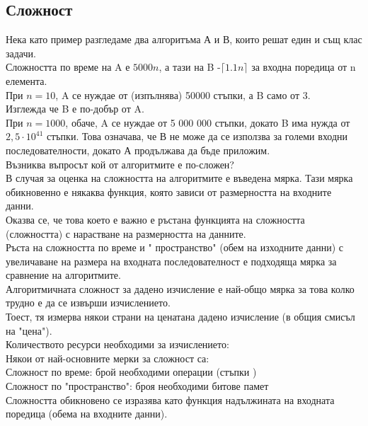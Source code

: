 \documentclass[fleqn, 12pt]{article}
\theoremstyle{definition}
\begin{document}
\subsection{Сложност}
Нека като пример разгледаме два алгоритъма А и В, които решат един и същ клас задачи.\\
Сложността по време на A е $5000n$, а тази на B -$\lceil 1.1n \rceil$ за входна поредица от n елемента.\\
При $n = 10$, A се нуждае от (изпълнява) 50000 стъпки, а B само от 3. \\
Изглежда че B е по-добър от A.\\
При $n = 1000$, обаче, A се нуждае от 5 000 000 стъпки, докато B има нужда от $2,5\cdot 10^{41}$ стъпки.
Това означава, че В не може да се използва за големи входни последователности, докато А продължава да бъде приложим.\\
Възниква въпросът кой от алгоритмите е по-сложен? \\
В случая за оценка на сложността на алгоритмите е въведена мярка. Тази мярка обикновенно е някаква функция, която зависи от размерността на входните данни.\\
Оказва се, че това което е важно е ръстана функцията на сложността (сложността) с нарастване на размерността на данните.\\
Ръста на сложността по време и " пространство" (обем на изходните данни) с увеличаване на размера на входната последователност е подходяща мярка за сравнение на алгоритмите.\\
Алгоритмичната сложност за дадено изчисление е най-общо мярка за това колко трудно е да се извърши изчислението.\\
Тоест, тя измерва някои страни на ценатана дадено изчисление (в общия смисъл на "цена").\\
Количеството ресурси необходими за изчислението:\\
Някои от най-основните мерки за сложност са:\\
Сложност по време: брой необходими операции (стъпки )\\
Сложност по "пространство": броя необходими битове памет\\
Сложността обикновено се изразява като функция надължината на входната поредица (обема на входните данни).
\end{document}
